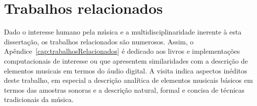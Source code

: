 \section{Trabalhos relacionados}

Dado o interesse humano pela música e a multidisciplinaridade inerente à esta dissertação, os trabalhos relacionados são numerosos. Assim, o Apêndice~\ref{cap:trabalhosRelacionados} é dedicado aos livros e implementações computacionais de interesse ou que apresentem similaridades com a descrição de elementos musicais em termos do áudio digital. A visita indica aspectos inéditos deste trabalho, em especial a descrição analítica de elementos musicais básicos em termos das amostras sonoras e a descrição natural, formal e concisa de técnicas tradicionais da música. 
